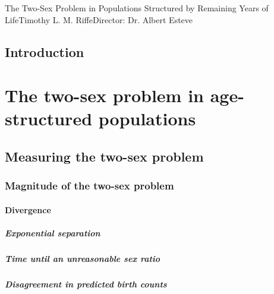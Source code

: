 \startabstractpage
{The Two-Sex Problem in Populations Structured by Remaining Years of
Life}{Timothy L. M. Riffe}{Director: Dr. Albert Esteve}

\label{Abstract}

\startthechapters 
 \chapter{Introduction}
 \label{chap:Intro}
 

\part*{The two-sex problem in age-structured populations}
  \chapter{Measuring the two-sex problem}
    
    \section{Magnitude of the two-sex problem}
      
      \subsection{Divergence}
        
        \subsubsection{Exponential separation}
          
        \subsubsection{Time until an unreasonable sex ratio}
          
        \subsubsection{Disagreement in predicted birth counts}
          
